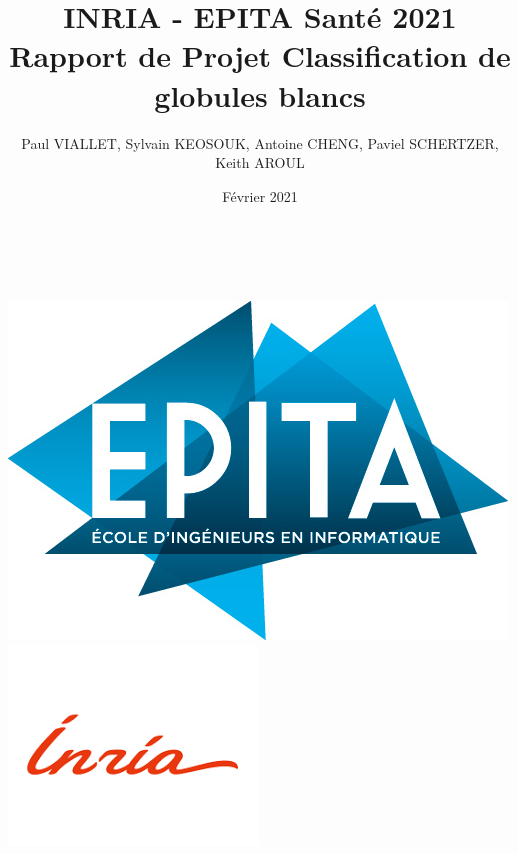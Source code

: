 \title{\large INRIA - EPITA Santé 2021\\[0.5cm]
        \bf\Large Rapport de Projet Classification de globules blancs}
\author{\large Paul VIALLET, Sylvain KEOSOUK, Antoine CHENG, Paviel SCHERTZER, Keith AROUL}
\date{Février 2021}
\makeatletter
    \begin{titlepage}
        \begin{center}
        \vbox{}\vspace{5cm}
            {\@title }\\[3cm] 
            {\@author}\\
            \vfill \includegraphics[scale=0.25]{images/epita-logo.jpg}\\[1cm] \includegraphics[scale=0.5]{images/inria.png}\\[1cm]
            {\@date}
        \end{center}
    \end{titlepage}
\makeatother
